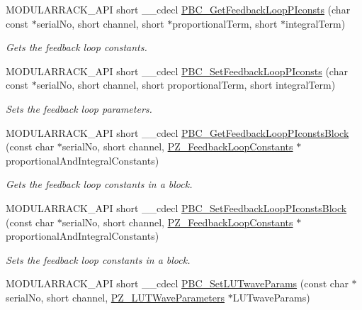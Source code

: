 \begin{DoxyCompactItemize}
M\+O\+D\+U\+L\+A\+R\+R\+A\+C\+K\+\_\+\+A\+PI short \+\_\+\+\_\+cdecl \hyperlink{group___modular_piezo_ga5df8d8d6e5ea499d81a66f6d3d2babe2}{P\+B\+C\+\_\+\+Get\+Feedback\+Loop\+P\+Iconsts} (char const $\ast$serial\+No, short channel, short $\ast$proportional\+Term, short $\ast$integral\+Term)
\begin{DoxyCompactList}\small\item\em Gets the feedback loop constants. \end{DoxyCompactList}\item 
M\+O\+D\+U\+L\+A\+R\+R\+A\+C\+K\+\_\+\+A\+PI short \+\_\+\+\_\+cdecl \hyperlink{group___modular_piezo_gacf425851b804b09fe743017870e3361f}{P\+B\+C\+\_\+\+Set\+Feedback\+Loop\+P\+Iconsts} (char const $\ast$serial\+No, short channel, short proportional\+Term, short integral\+Term)
\begin{DoxyCompactList}\small\item\em Sets the feedback loop parameters. \end{DoxyCompactList}\item 
M\+O\+D\+U\+L\+A\+R\+R\+A\+C\+K\+\_\+\+A\+PI short \+\_\+\+\_\+cdecl \hyperlink{group___modular_piezo_gaa3ece351abfb8742ce89ec372f1b7b6b}{P\+B\+C\+\_\+\+Get\+Feedback\+Loop\+P\+Iconsts\+Block} (const char $\ast$serial\+No, short channel, \hyperlink{struct_p_z___feedback_loop_constants}{P\+Z\+\_\+\+Feedback\+Loop\+Constants} $\ast$proportional\+And\+Integral\+Constants)
\begin{DoxyCompactList}\small\item\em Gets the feedback loop constants in a block. \end{DoxyCompactList}\item 
M\+O\+D\+U\+L\+A\+R\+R\+A\+C\+K\+\_\+\+A\+PI short \+\_\+\+\_\+cdecl \hyperlink{group___modular_piezo_gaa79dacc53397cb9a3c0ca321f142aaae}{P\+B\+C\+\_\+\+Set\+Feedback\+Loop\+P\+Iconsts\+Block} (const char $\ast$serial\+No, short channel, \hyperlink{struct_p_z___feedback_loop_constants}{P\+Z\+\_\+\+Feedback\+Loop\+Constants} $\ast$proportional\+And\+Integral\+Constants)
\begin{DoxyCompactList}\small\item\em Sets the feedback loop constants in a block. \end{DoxyCompactList}\item 
M\+O\+D\+U\+L\+A\+R\+R\+A\+C\+K\+\_\+\+A\+PI short \+\_\+\+\_\+cdecl \hyperlink{group___modular_piezo_gae800ab5b723b221f4d998c01930bda12}{P\+B\+C\+\_\+\+Set\+L\+U\+Twave\+Params} (const char $\ast$serial\+No, short channel, \hyperlink{struct_p_z___l_u_t_wave_parameters}{P\+Z\+\_\+\+L\+U\+T\+Wave\+Parameters} $\ast$L\+U\+Twave\+Params)

\end{DoxyCompactItemize}
